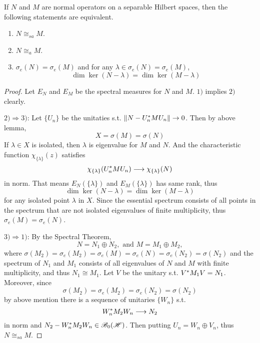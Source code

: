 \begin{thm}
	If $N$ and $M$ are normal operators on a separable Hilbert spaces, then the following statements are equivalent.
	\begin{enumerate}[label = \arabic*)]
		\item $N \cong_{sa} M$.
		\item $N \cong_a M$.
		\item $\sigma_e(N) = \sigma_e(M)$ and for any $\lambda \in \sigma_e(N) = \sigma_e(M)$,
		\begin{equation*}
			\dim{\ker{(N-\lambda)}} = \dim{\ker{(M-\lambda)}}
		\end{equation*}
	\end{enumerate}
\end{thm}
\begin{proof}
	Let $E_N$ and $E_M$ be the spectral measures for $N$ and $M$. $1)$ implies $2)$ clearly.
	\item $2) \Rightarrow 3)$: Let $\{U_n\}$ be the unitaties s.t. $\left\lVert N - U_n^{*}MU_n\right\lVert \rightarrow 0$. Then by above lemma, 
	\begin{equation*}
		X = \sigma(M) = \sigma(N)
	\end{equation*}
	If $\lambda \in X$ is isolated, then $\lambda$ is eigenvalue for $M$ and $N$. And the characteristic function $\chi_{\{\lambda\}}(z)$ satisfies
	\begin{equation*}
		\chi_{\{\lambda\}}(U^{*}_nMU_n) \longrightarrow \chi_{\{\lambda\}}(N)
	\end{equation*}
	in norm. That means $E_N(\{\lambda\})$ and $E_M(\{\lambda\})$ has same rank, thus 
	\begin{equation*}
		\dim{\ker{(N-\lambda)}} = \dim{\ker{(M-\lambda)}}
	\end{equation*}
	for any isolated point $\lambda$ in $X$. Since the essential spectrum consists of all points in the spectrum that are not isolated eigenvalues of finite multiplicity, thus $\sigma_e(M) = \sigma_e(N)$.
	\item $3) \Rightarrow 1)$: By the Spectral Theorem, 
	\begin{equation*}
		N = N_1 \oplus N_2, \text{ and } M = M_1 \oplus M_2,
	\end{equation*}
	where $\sigma(M_2) = \sigma_e(M_2) = \sigma_e(M) = \sigma_e(N) = \sigma_e(N_2) = \sigma(N_2)$ and the spectrum of $N_1$ and $M_1$ consists of all eigenvalues of $N$ and $M$ with finite multiplicity, and thus $N_1 \cong M_1$. Let $V$ be the unitary s.t. $V^{*}M_1V = N_1$. Moreover, since
	\begin{equation*}
		\sigma(M_2) = \sigma_e(M_2) = \sigma_e(N_2) = \sigma(N_2)
	\end{equation*}
	by above mention there is a sequence of unitaries $\{W_n\}$ s.t.
	\begin{equation*}
		W^{*}_n M_2 W_n \longrightarrow N_2
 	\end{equation*}
 	in norm and $N_2 - W^{*}_n M_2 W_n \in \mathscr{B}_{0}\mathscr{(H)}$. Then putting $U_n = W_n \oplus V_n$, thus $N \cong_{sa} M$. 
\end{proof}
